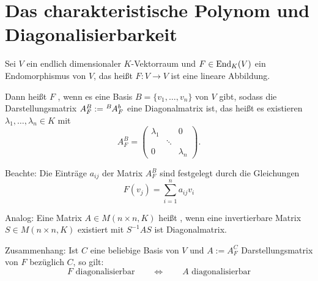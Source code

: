 \section{Das charakteristische Polynom und Diagonalisierbarkeit}
\label{sec:2.2}

Sei $V$ ein endlich dimensionaler $K$-Vektorraum und $F \in \operatorname{End}_K(V)$ ein Endomorphismus von $V$, das heißt $F\colon V \rightarrow V$ ist eine lineare Abbildung.

Dann heißt $F$ , wenn es eine Basis $B=\{v_1,\dots,v_n\}$ von $V$ gibt, sodass die Darstellungsmatrix $A_F^B := \mat{A}{B}{b}{F}$ eine Diagonalmatrix ist, das heißt es existieren $\lambda_1,\dots,\lambda_n \in K$ mit
\[
	A^B_F = \begin{pmatrix}
	\lambda_1 &  & 0 \\ 
	& \ddots &  \\ 
	0 &  & \lambda_n
	\end{pmatrix}.
\]

Beachte: Die Einträge $a_{ij}$ der Matrix $A_F^B$ sind festgelegt durch die Gleichungen
\begin{equation}
	F(v_j) = \sum_{i=1}^{n} a_{ij} v_i	\label{eq:darstellungsmatrix}
\end{equation}

Analog: Eine Matrix $A \in M(n\times n,K)$ heißt , wenn eine invertierbare Matrix $S \in M(n \times n,K)$ existiert mit $S^{-1}AS$ ist Diagonalmatrix.

Zusammenhang: Ist $C$ eine beliebige Basis von $V$ und $A := A_F^C$ Darstellungsmatrix von $F$ bezüglich $C$, so gilt:
\[
	F \text{ diagonalisierbar} \qquad \Leftrightarrow \qquad A \text{ diagonalisierbar}
\]

